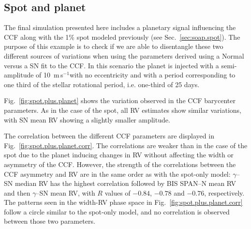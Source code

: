 \documentclass{aa}
\def\ms{\hbox{\,m\,s$^{-1}$}}         %
\begin{document}
\subsection{Spot and planet} \label{sec:soap.spot.planet}

The final simulation presented here includes a planetary signal influencing the CCF along with the 1\% spot modeled previously (see Sec.~\ref{sec:soap.spot}). 
The purpose of this example is to check if we are able to disentangle these two different sources of variations when using the parameters derived using a Normal versus a SN fit to the CCF. In this scenario the planet is injected with a semi-amplitude of 10 \ms with no eccentricity and with a period corresponding to one third of the stellar rotational period, i.e. one-third of 25 days.

Fig.~\ref{fig:spot.plus.planet} shows the variation observed in the CCF barycenter parameters. As in the case of the spot, all RV estimates show similar variations, with SN mean RV showing a slightly smaller amplitude.

The correlation between the different CCF parameters are displayed in Fig.~\ref{fig:spot.plus.planet.corr}. 
The correlations are weaker than in the case of the spot due to the planet inducing changes in RV without affecting the width or asymmetry of the CCF.  However, the strength of the correlations between the CCF asymmetry and RV are in the same order as with the spot-only model: $\gamma$--SN median RV has the highest correlation followed by BIS SPAN--N mean RV and then $\gamma$--SN mean RV, with $R$ values of $-0.84$, $-0.78$ and $-0.76$, respectively. 
The patterns seen in the width-RV phase space in Fig.~\ref{fig:spot.plus.planet.corr} follow a circle similar to the spot-only model, and no correlation is observed between those two parameters.
\end{document}
